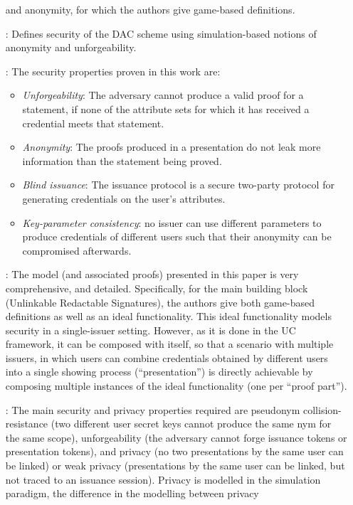\begin{enumerate}
  and anonymity, for which the authors give game-based definitions.
\item[\cite{cklm14}:] Defines security of the DAC scheme using simulation-based
  notions of anonymity and unforgeability.
\item[\cite{cmz14}:] The security properties proven in this work are:
  \begin{itemize}
  \item \emph{Unforgeability}: The adversary cannot produce a valid proof for a
    statement, if none of the attribute sets for which it has received a
    credential meets that statement.
  \item \emph{Anonymity}: The proofs produced in a presentation do not leak
    more information than the statement being proved.
  \item \emph{Blind issuance}: The issuance protocol is a secure two-party
    protocol for generating credentials on the user's attributes.
  \item \emph{Key-parameter consistency}: no issuer can use different parameters
    to produce credentials of different users such that their anonymity can
    be compromised afterwards. 
  \end{itemize}
\item[\cite{cdhk15}:] The model (and associated proofs) presented in this paper
  is very comprehensive, and detailed. Specifically, for the main building block
  (Unlinkable Redactable Signatures), the authors give both game-based
  definitions as well as an ideal functionality. This ideal functionality models
  security in a single-issuer setting. However, as it is done in the UC
  framework, it can be composed with itself, so that a scenario with multiple
  issuers, in which users can combine credentials obtained by different users
  into a single showing process (``presentation'') is directly achievable by
  composing multiple instances of the ideal functionality (one per ``proof
  part'').
\item[\cite{ckl+15}:] The main security and privacy properties required are
  pseudonym collision-resistance (two different user secret keys cannot produce
  the same nym for the same scope), unforgeability (the adversary cannot forge
  issuance tokens or presentation tokens), and privacy (no two presentations by
  the same user can be linked) or weak privacy (presentations by the same user
  can be linked, but not traced to an issuance session). Privacy is modelled
  in the simulation paradigm, the difference in the modelling between privacy

\end{enumerate}
